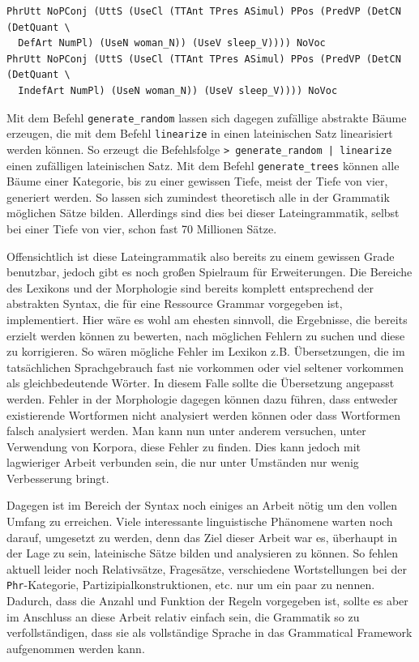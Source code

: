 \begin{lstlisting}[float=ht,caption={Abstrakte Syntaxrepräsentationen des Satzes \textit{feminae dormiunt}},label={GF-AbstractStrings},basicstyle=\footnotesize]
PhrUtt NoPConj (UttS (UseCl (TTAnt TPres ASimul) PPos (PredVP (DetCN (DetQuant \
  DefArt NumPl) (UseN woman_N)) (UseV sleep_V)))) NoVoc 
PhrUtt NoPConj (UttS (UseCl (TTAnt TPres ASimul) PPos (PredVP (DetCN (DetQuant \
  IndefArt NumPl) (UseN woman_N)) (UseV sleep_V)))) NoVoc
\end{lstlisting}
Mit dem Befehl \texttt{generate\_random} lassen sich dagegen zufällige abstrakte Bäume erzeugen, die mit dem Befehl \texttt{linearize} in einen lateinischen Satz linearisiert werden können. So erzeugt die Befehlsfolge \texttt{> generate\_random | linearize } einen zufälligen lateinischen Satz. Mit dem Befehl \texttt{generate\_trees} können alle Bäume einer Kategorie, bis zu einer gewissen Tiefe, meist der Tiefe von vier, generiert werden. So lassen sich zumindest theoretisch alle in der Grammatik möglichen Sätze bilden. Allerdings sind dies bei dieser Lateingrammatik, selbst bei einer Tiefe von vier, schon fast 70 Millionen Sätze. \par
Offensichtlich ist diese Lateingrammatik also bereits zu einem gewissen Grade benutzbar, jedoch gibt es noch großen Spielraum für Erweiterungen. Die Bereiche des Lexikons und der Morphologie sind bereits komplett entsprechend der abstrakten Syntax, die für eine Ressource Grammar vorgegeben ist, implementiert. Hier wäre es wohl am ehesten sinnvoll, die Ergebnisse, die bereits erzielt werden können zu bewerten, nach möglichen Fehlern zu suchen und diese zu korrigieren. So wären mögliche Fehler im Lexikon z.B. Übersetzungen, die im tatsächlichen Sprachgebrauch fast nie vorkommen oder viel seltener vorkommen als gleichbedeutende Wörter. In diesem Falle sollte die Übersetzung angepasst werden. Fehler in der Morphologie dagegen können dazu führen, dass entweder existierende Wortformen nicht analysiert werden können oder dass Wortformen falsch analysiert werden. Man kann nun unter anderem versuchen, unter Verwendung von Korpora, diese Fehler zu finden. Dies kann jedoch mit lagwieriger Arbeit verbunden sein, die nur unter Umständen nur wenig Verbesserung bringt. \par
Dagegen ist im Bereich der Syntax noch einiges an Arbeit nötig um den vollen Umfang zu erreichen. Viele interessante linguistische Phänomene warten noch darauf, umgesetzt zu werden, denn das Ziel dieser Arbeit war es, überhaupt in der Lage zu sein, lateinische Sätze bilden und analysieren zu können. So fehlen aktuell leider noch Relativsätze, Fragesätze, verschiedene Wortstellungen bei der \texttt{Phr}-Kategorie, Partizipialkonstruktionen, etc. nur um ein paar zu nennen. Dadurch, dass die Anzahl und Funktion der Regeln vorgegeben ist, sollte es aber im Anschluss an diese Arbeit relativ einfach sein, die Grammatik so zu verfollständigen, dass sie als vollständige Sprache in das Grammatical Framework aufgenommen werden kann. 
